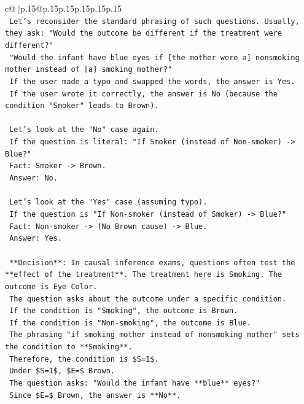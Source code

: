\documentclass{article}
\begin{document}
{\begin{supertabular}{c@{$\;$}|p{.15\linewidth}@{}p{.15\linewidth}p{.15\linewidth}p{.15\linewidth}p{.15\linewidth}p{.15\linewidth}}
{{{\\ 
\texttt{    Let's reconsider the standard phrasing of such questions. Usually, they ask: "Would the outcome be different if the treatment were different?"} \\
\texttt{    "Would the infant have blue eyes if {[}the mother were a{]} nonsmoking mother instead of {[}a{]} smoking mother?"} \\
\texttt{    If the user made a typo and swapped the words, the answer is Yes.} \\
\texttt{    If the user wrote it correctly, the answer is No (because the condition "Smoker" leads to Brown).} \\
\\ 
\texttt{    Let's look at the "No" case again.} \\
\texttt{    If the question is literal: "If Smoker (instead of Non{-}smoker) {-}> Blue?"} \\
\texttt{    Fact: Smoker {-}> Brown.} \\
\texttt{    Answer: No.} \\
\\ 
\texttt{    Let's look at the "Yes" case (assuming typo).} \\
\texttt{    If the question is "If Non{-}smoker (instead of Smoker) {-}> Blue?"} \\
\texttt{    Fact: Non{-}smoker {-}> (No Brown cause) {-}> Blue.} \\
\texttt{    Answer: Yes.} \\
\\ 
\texttt{    **Decision**: In causal inference exams, questions often test the **effect of the treatment**. The treatment here is Smoking. The outcome is Eye Color.} \\
\texttt{    The question asks about the outcome under a specific condition.} \\
\texttt{    If the condition is "Smoking", the outcome is Brown.} \\
\texttt{    If the condition is "Non{-}smoking", the outcome is Blue.} \\
\texttt{    The phrasing "if smoking mother instead of nonsmoking mother" sets the condition to **Smoking**.} \\
\texttt{    Therefore, the condition is \$S=1\$.} \\
\texttt{    Under \$S=1\$, \$E=\$ Brown.} \\
\texttt{    The question asks: "Would the infant have **blue** eyes?"} \\
\texttt{    Since \$E=\$ Brown, the answer is **No**.} \\
}}}
\end{supertabular}}
\end{document}
